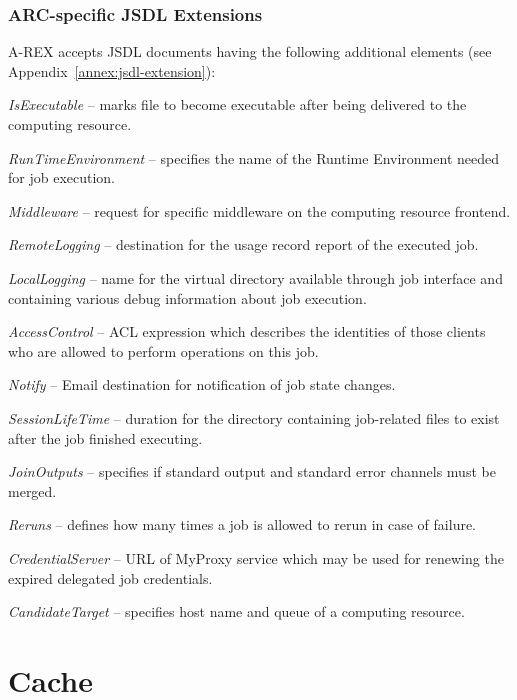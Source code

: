 \documentclass{article}                            %
\begin{document}
\subsubsection{ARC-specific JSDL Extensions}

A-REX accepts JSDL documents having the following additional elements
(see Appendix~\ref{annex:jsdl-extension}):

\begin{list}{--}{\setlength{\labelwidth}{0.5cm}\setlength{\rightmargin}{\leftmargin}}
\item [{\emph{IsExecutable}}] -- marks file to become executable
after being delivered to the computing resource.
\item [{\emph{RunTimeEnvironment}}] -- specifies the name of the Runtime
Environment needed for job execution.
\item [{\emph{Middleware}}] -- request for specific middleware on the computing
resource frontend.
\item [{\emph{RemoteLogging}}] -- destination for the usage record
report of the executed job.
\item [{\emph{LocalLogging}}] -- name for the virtual directory available
through job interface and containing various debug information about
job execution.
\item [{\emph{AccessControl}}] -- ACL expression which describes the identities
of those clients who are allowed to perform operations on this job.
\item [{\emph{Notify}}] -- Email destination for notification of job state
changes.
\item [{\emph{SessionLifeTime}}] -- duration for the directory containing
job-related files to exist after the job finished executing.
\item [{\emph{JoinOutputs}}] -- specifies if standard output and standard
error channels must be merged.
\item [{\emph{Reruns}}] -- defines how many times a job is allowed
to rerun in case of failure.
\item [{\emph{CredentialServer}}] -- URL of MyProxy service which
may be used for renewing the expired delegated job credentials.
\item [{\emph{CandidateTarget}}] -- specifies host name and queue
of a computing resource.
\end{list}

\section{Cache\label{sec:cache}}
\end{document}
